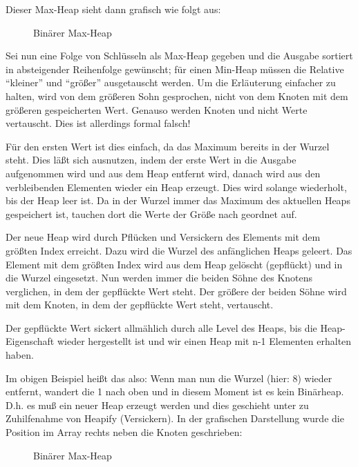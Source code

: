 \documentclass[ngerman,draft,parskip=half*,twoside]{scrreprt}
\theoremstyle{break}
\theoremstyle{nonumberbreak}
\begin{document}
Dieser Max-Heap sieht dann grafisch wie folgt aus:

\begin{figure}[H]
	\centering
	\caption{Binärer Max-Heap}
	\label{101103c}
\end{figure}

Sei nun eine Folge von Schlüsseln als Max-Heap gegeben und die Ausgabe sortiert in absteigender Reihenfolge gewünscht; für einen
Min-Heap müssen die Relative "`kleiner"' und "`größer"' ausgetauscht werden. Um die Erläuterung einfacher zu halten, wird von dem
größeren Sohn gesprochen, nicht von dem Knoten mit dem größeren gespeicherten Wert. Genauso werden Knoten und nicht Werte vertauscht.
Dies ist allerdings formal falsch!

Für den ersten Wert ist dies einfach, da das Maximum bereits in der Wurzel steht.
Dies läßt sich ausnutzen, indem der erste Wert in die Ausgabe aufgenommen wird und aus dem Heap entfernt wird, danach wird aus den
verbleibenden Elementen wieder ein Heap erzeugt. Dies wird solange wiederholt, bis der Heap leer ist. Da in der Wurzel immer das Maximum
des aktuellen Heaps gespeichert ist, tauchen dort die Werte der Größe nach geordnet auf.

Der neue Heap wird durch Pflücken und Versickern des Elements mit dem größten Index erreicht. Dazu wird die Wurzel des anfänglichen Heaps geleert. Das Element mit dem größten Index wird aus dem Heap gelöscht
(gepflückt) und in die Wurzel eingesetzt.
Nun werden immer die beiden Söhne des Knotens verglichen, in dem der gepflückte Wert steht. Der größere der beiden Söhne wird mit
dem Knoten, in dem der gepflückte Wert steht, vertauscht.

Der gepflückte Wert sickert allmählich durch alle Level des Heaps, bis die
Heap-Eigenschaft wieder hergestellt ist und wir einen Heap mit n-1 Elementen erhalten haben.

Im obigen Beispiel heißt das also:
Wenn man nun die Wurzel (hier: 8) wieder entfernt, wandert die 1 nach oben und in diesem Moment ist es kein Binärheap. D.h. es muß
ein neuer Heap erzeugt werden und dies geschieht unter zu Zuhilfenahme von Heapify (Versickern).
In der grafischen Darstellung wurde die Position im Array rechts neben die Knoten geschrieben:
\begin{figure}[H]
	\centering \hspace{2cm}
	\caption{Binärer Max-Heap}
	\label{101103de}
\end{figure}
\end{document}
